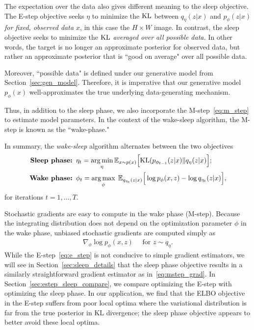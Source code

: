 The expectation over the data also gives different meaning to the sleep objective. The E-step objective seeks $\eta$ to minimize the $\textrm{KL}$ between $q_\eta(z | x)$ and $p_\phi(z | x)$ {\itshape for fixed, observed data $x$},
in this case the $H\times W$ image. In contrast, the sleep objective seeks to minimize the $\textrm{KL}$ {\itshape averaged over all possible data. } In other words, the target is no longer an approximate posterior for observed data, but rather an approximate posterior that is ``good on average" over all possible data.

Moreover, ``possible data" is defined under our generative model from Section~\ref{sec:gen_model}. Therefore, it is imperative that our generative model $p_\phi(x)$ well-approximates the true underlying data-generating mechanism. 

Thus, in addition to the sleep phase, we also incorporate the M-step~\eqref{eq:m_step} to estimate model parameters. In the context of the wake-sleep algorithm, the M-step is known as the ``wake-phase."

In summary, the {\itshape wake-sleep} algorithm alternates between the two objectives 
\begin{align}
    \text{{\bf Sleep phase: }} & 
    \eta_{t} = \operatorname*{arg\,min}_{\eta} \mathbb{E}_{x \sim p(x)}\Big[\textrm{KL}(p_{\phi_{t-1}}(z | x) \| q_\eta(z | x)\Big]
    \label{eq:sleep_phase_summary}; 
    \\
    \text{{\bf Wake phase: }} & \phi_{t} = \operatorname*{arg\,max}_{\phi}\; \mathbb{E}_{q_{\eta_t}(z | x)}\Big[\log p_{\phi}(x, z) - \log q_{\eta_t}(z | x)\Big],
    \label{eq:wake_phase_summary}
\end{align} 
for iterations $t = 1, ..., T$. 

Stochastic gradients are easy to compute in the wake phase (M-step). Because the integrating distribution does not depend on the optimization parameter $\phi$ in the wake phase, unbiased stochastic gradients are computed simply as 
\begin{align}
    \nabla_\phi \log p_\phi(x, z) \quad \text{ for } z\sim q_\eta. 
    \label{eq:mstep_grad}
\end{align}
While the E-step~\eqref{eq:e_step} is not conducive to simple gradient estimators, we will see in Section~\ref{sec:sleep_details} that the sleep phase objective
results in a similarly straightforward gradient estimator as in~\eqref{eq:mstep_grad}. 
In Section~\ref{sec:estep_sleep_compare}, 
we compare optimizing the E-step with optimizing the sleep phase. In our application, we find that
the ELBO objective in the E-step suffers from poor local optima where the variational distribution is far from the true posterior in KL divergence; the sleep phase objective appears to better avoid these local optima. 


